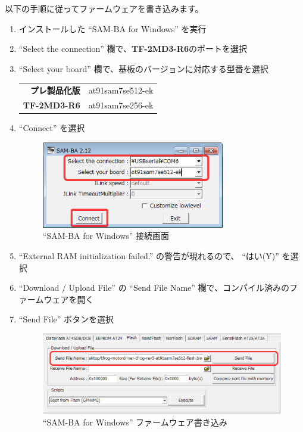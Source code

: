 \documentclass[11pt,a4j,openany,fleqn]{jbook}
\begin{document}
以下の手順に従ってファームウェアを書き込みます。
\begin{enumerate}
	\item インストールした ``SAM-BA for Windows'' を実行
	\item ``Select the connection'' 欄で、{\bf TF-2MD3-R6}のポートを選択
	\item ``Select your board'' 欄で、基板のバージョンに対応する型番を選択
		\begin{center}
		\begin{tabular}{rl}
			\hline
			{\bf プレ製品化版} & at91sam7se512-ek \\
			{\bf TF-2MD3-R6}   & at91sam7se256-ek \\
			\hline
		\end{tabular}
		\end{center}
	\item ``Connect'' を選択
		\begin{figure}[H]
			\centering\includegraphics[width=80mm]{sam-ba.connect.eps}
			\caption{ ``SAM-BA for Windows'' 接続画面}
			\label{fig:sam-ba.connect}
		\end{figure}
	\item ``External RAM initialization failed.'' の警告が現れるので、 ``はい(Y)'' を選択
	\item ``Download / Upload File'' の ``Send File Name'' 欄で、コンパイル済みのファームウェアを開く
	\item ``Send File'' ボタンを選択
		\begin{figure}[H]
			\centering\includegraphics[width=148mm]{sam-ba.write.eps}
			\caption{ ``SAM-BA for Windows'' ファームウェア書き込み}
			\label{fig:sam-ba.write}
		\end{figure}

\end{enumerate}
\end{document}
